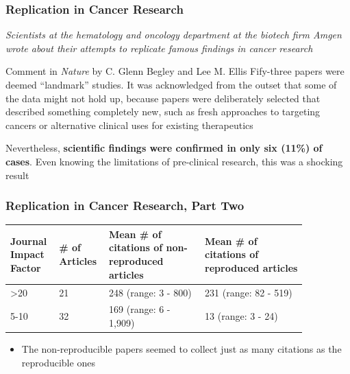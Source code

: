 \documentclass[10pt, block=fill]{beamer}
\begin{document}
\begin{frame}
  \frametitle{Replication in Cancer Research}

  \textit{Scientists at the hematology and oncology department at the biotech firm Amgen wrote about their attempts to replicate famous findings in cancer research}
  
  \begin{block}{Comment in \textit{Nature} by C. Glenn Begley and Lee M. Ellis}
  Fify-three papers were deemed ``landmark'' studies. It was acknowledged from the outset that some of the data might not hold up, because papers were deliberately selected that described something completely new, such as fresh approaches to targeting cancers or alternative clinical uses for existing therapeutics \par
  Nevertheless, \textbf{scientific findings were confirmed in only six (11\%) of cases}. Even knowing the limitations of pre-clinical research, this was a shocking result
  \end{block}

\end{frame}


\begin{frame}
  \frametitle{Replication in Cancer Research, Part Two}

  \begin{tabular}{b{0.12\linewidth}b{0.12\linewidth}b{0.3\linewidth}b{0.32\linewidth}}
    \textbf{Journal Impact Factor} & \textbf{\# of Articles} & \textbf{Mean \# of citations of non-reproduced articles} & \textbf{Mean \# of citations of reproduced articles} \\ \hline
    >20 & 21 & 248 (range: 3 - 800) & 231 (range: 82 - 519) \\
    5-10 & 32 & 169 (range: 6 - 1,909) & 13 (range: 3 - 24)
  \end{tabular}

  \vspace{0.25in}
  
  \begin{itemize}
      \item The non-reproducible papers seemed to collect just as many citations as the reproducible ones
    \end{itemize}
      
\end{frame}
\end{document}
